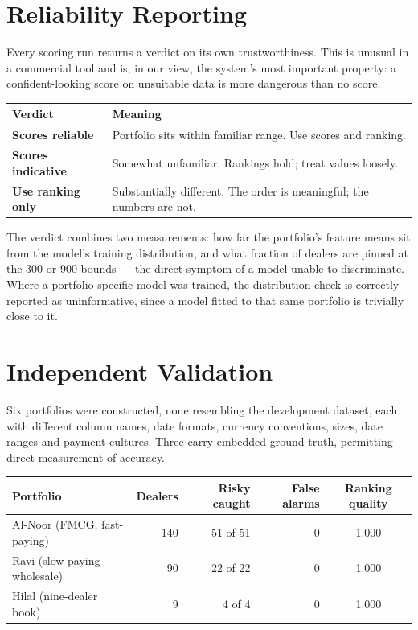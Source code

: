 \documentclass[11pt,a4paper]{article}
\begin{document}
\section{Reliability Reporting}

Every scoring run returns a verdict on its own trustworthiness. This is unusual
in a commercial tool and is, in our view, the system's most important property:
a confident-looking score on unsuitable data is more dangerous than no score.

\begin{center}
\small
\begin{tabularx}{0.95\textwidth}{@{}p{3.4cm}X@{}}
\toprule
\textbf{Verdict} & \textbf{Meaning} \\
\midrule
\textcolor{ok}{\textbf{Scores reliable}} &
Portfolio sits within familiar range. Use scores and ranking. \\
\textcolor{warn}{\textbf{Scores indicative}} &
Somewhat unfamiliar. Rankings hold; treat values loosely. \\
\textcolor{bad}{\textbf{Use ranking only}} &
Substantially different. The order is meaningful; the numbers are not. \\
\bottomrule
\end{tabularx}
\end{center}

\vspace{-2pt}
The verdict combines two measurements: how far the portfolio's feature means sit
from the model's training distribution, and what fraction of dealers are pinned
at the 300 or 900 bounds --- the direct symptom of a model unable to
discriminate. Where a portfolio-specific model was trained, the distribution
check is correctly reported as uninformative, since a model fitted to that same
portfolio is trivially close to it.

\section{Independent Validation}

Six portfolios were constructed, none resembling the development dataset, each
with different column names, date formats, currency conventions, sizes, date
ranges and payment cultures. Three carry embedded ground truth, permitting
direct measurement of accuracy.

\begin{center}
\small
\begin{tabular}{@{}lrrrc@{}}
\toprule
\textbf{Portfolio} & \textbf{Dealers} & \textbf{Risky caught} &
\textbf{False alarms} & \textbf{Ranking quality} \\
\midrule
Al-Noor (FMCG, fast-paying)      & 140 & 51 of 51 & 0 & 1.000 \\
Ravi (slow-paying wholesale)     &  90 & 22 of 22 & 0 & 1.000 \\
Hilal (nine-dealer book)         &   9 &   4 of 4 & 0 & 1.000 \\
\bottomrule
\end{tabular}
\end{center}
\end{document}

